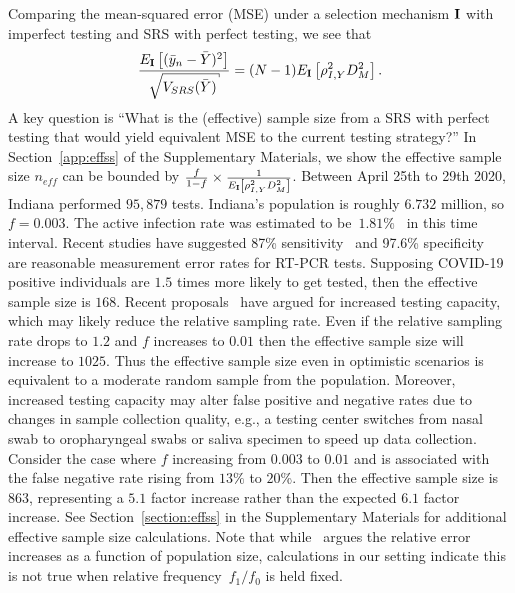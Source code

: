 \documentclass[11pt]{amsart}
\numberwithin{equation}{section}
\theoremstyle{plain}
\def\I{\bf I}
\begin{document}
 Comparing the mean-squared error (MSE) under a selection mechanism $\I$ with imperfect testing and SRS with perfect testing, we see that
 $$
 \frac{E_{\I} \left[ (\bar y_n - \bar Y)^2 \right]}{\sqrt{V_{SRS} (\bar Y)}} = (N-1) E_{\I} \left[ \rho_{I,Y}^2 D_M^2 \right].
 $$
 A key question is ``What is the (effective) sample size from a SRS with perfect testing that would yield equivalent MSE to the current testing strategy?'' In Section~\ref{app:effss} of the Supplementary Materials, we show the effective sample size $n_{eff}$ can be bounded by $\frac{f}{1-f} \times \frac{1}{E_{\I} \left[ \rho_{I,Y}^2 D_M^2 \right]}$. Between April 25th to 29th 2020, Indiana performed $95,879$ tests.  Indiana's population is roughly $6.732$ million, so $f = 0.003$.  The active infection rate was estimated to be~$1.81\%$~\citep{Yiannoutsos2021} in this time interval. Recent studies have suggested 87\% sensitivity~\citep{Arevalo2020} and 97.6\% specificity~\citep{Cohen2020} are reasonable measurement error rates for RT-PCR tests. Supposing COVID-19 positive individuals are $1.5$ times more likely to get tested, then the effective sample size is $168$. Recent proposals~\citep{Siddarth2020} have argued for increased testing capacity, which may likely reduce the relative sampling rate.  Even if the relative sampling rate drops to $1.2$ and $f$ increases to $0.01$ then the effective sample size will increase to $1025$.  Thus the effective sample size even in optimistic scenarios is equivalent to a moderate random sample from the population.  Moreover, increased testing capacity may alter false positive and negative rates due to changes in sample collection quality, e.g., a testing center switches from nasal swab to oropharyngeal swabs or saliva specimen to speed up data collection.  Consider the case where $f$ increasing from $0.003$ to $0.01$ and is associated with the false negative rate rising from $13\%$ to $20$\%.  Then the effective sample size is $863$, representing a $5.1$ factor increase rather than the expected $6.1$ factor increase. See Section~\ref{section:effss} in the Supplementary Materials for additional effective sample size calculations.  Note that while~\citep{Meng2018} argues the relative error increases as a function of population size, calculations in our setting indicate this is not true when relative frequency~$f_1/f_0$ is held fixed.
\end{document}
